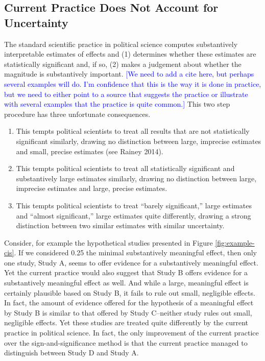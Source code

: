 \documentclass[12pt]{article}
\newcommand{\kelly}[1]{\textcolor{blue}{#1}}
\begin{document}
\subsection*{Current Practice Does Not Account for Uncertainty}

The standard scientific practice in political science computes substantively interpretable estimates of effects and (1) determines whether these estimates are statistically significant and, if so, (2) makes a judgement about whether the magnitude is substantively important. \kelly{[We need to add a cite here, but perhaps several examples will do. I'm confidence that this is the way it is done in practice, but we need to either point to a source that suggests the practice or illustrate with several examples that the practice is quite common.]} This two step procedure has three unfortunate consequences.
\singlespace
\begin{enumerate}
\item This tempts political scientists to treat all results that are not statistically significant similarly, drawing no distinction between large, imprecise estimates and small, precise estimates (see Rainey 2014).
\item This tempts political scientists to treat all statistically significant and substantively large estimates similarly, drawing no distinction between large, imprecise estimates and large, precise estimates.
\item This tempts political scientists to treat ``barely significant,'' large estimates and ``almost significant,'' large estimates quite differently, drawing a strong distinction between two similar estimates with similar uncertainty.
\end{enumerate}
\doublespace

Consider, for example the hypothetical studies presented in Figure \ref{fig:example-cis}. If we considered 0.25 the minimal substantively meaningful effect, then only one study, Study A, seems to offer evidence for a substantively meaningful effect. Yet the current practice would also suggest that Study B offers evidence for a substantively meaningful effect as well. And while a large, meaningful effect is certainly plausible based on Study B, it fails to rule out small, negligible effects. In fact, the amount of evidence offered for the hypothesis of a meaningful effect by Study B is similar to that offered by Study C--neither study rules out small, negligible effects. Yet these studies are treated quite differently by the current practice in political science. In fact, the only improvement of the current practice over the sign-and-significance method is that the current practice managed to distinguish between Study D and Study A.
\end{document}
